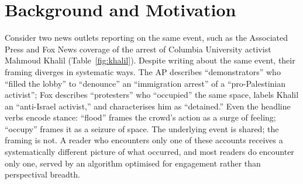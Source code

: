 \section{Background and Motivation}

Consider two news outlets reporting on the same event, such as the Associated Press and Fox News coverage of the arrest of Columbia University activist Mahmoud Khalil (Table~\ref{fig:khalil}). Despite writing about the same event, their framing diverges in systematic ways. The AP describes ``demonstrators'' who ``filled the lobby'' to ``denounce'' an ``immigration arrest'' of a ``pro-Palestinian activist''; Fox describes ``protesters'' who ``occupied'' the same space, labels Khalil an ``anti-Israel activist,'' and characterises him as ``detained.'' Even the headline verbs encode stance: ``flood'' frames the crowd's action as a surge of feeling; ``occupy'' frames it as a seizure of space. The underlying event is shared; the framing is not. A reader who encounters only one of these accounts receives a systematically different picture of what occurred, and most readers do encounter only one, served by an algorithm optimised for engagement rather than perspectival breadth.

